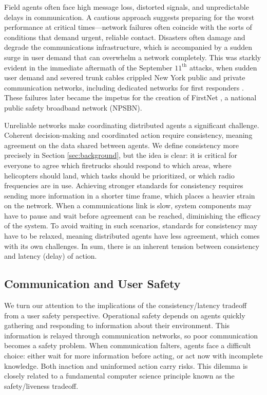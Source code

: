 \documentclass[]             %
{NASA}                       %
\theoremstyle{definition}
\begin{document}
Field agents often face high message loss, distorted signals, and
unpredictable delays in communication. A cautious approach suggests
preparing for the worst performance at critical times---network
failures often coincide with the sorts of conditions that demand
urgent, reliable contact. Disasters often damage and degrade the
communications infrastructure, which is accompanied by a sudden surge
in user demand that can overwhelm a network completely. This was
starkly evident in the immediate aftermath of the September
$11^\textrm{th}$ attacks, when sudden user demand and severed trunk
cables crippled New York public and private communication networks,
including dedicated networks for first responders
\cite{2011:Reardon}. These failures later became the impetus for the
creation of FirstNet \cite{2021:firstnet, 2021:firstnet2}, a national
public safety broadband network (NPSBN).

Unreliable networks make coordinating distributed agents a significant
challenge. Coherent decision-making and coordinated action require
consistency, meaning agreement on the data shared between agents. We
define consistency more precisely in Section \ref{sec:background}, but
the idea is clear: it is critical for everyone to agree which
firetrucks should respond to which areas, where helicopters should
land, which tasks should be prioritized, or which radio frequencies
are in use. Achieving stronger standards for consistency requires
sending more information in a shorter time frame, which places a
heavier strain on the network. When a communications link is slow,
system components may have to pause and wait before agreement can be
reached, diminishing the efficacy of the system. To avoid waiting in
such scenarios, standards for consistency may have to be relaxed,
meaning distributed agents have less agreement, which comes with its
own challenges. In sum, there is an inherent tension between
consistency and latency (delay) of action.

\subsection{Communication and User Safety}
\label{ssec:communication-and-safety}
We turn our attention to the implications of the consistency/latency
tradeoff from a user safety perspective. Operational safety depends on
agents quickly gathering and responding to information about their
environment. This information is relayed through communication
networks, so poor communication becomes a safety problem. When
communication falters, agents face a difficult choice: either wait for
more information before acting, or act now with incomplete
knowledge. Both inaction and uninformed action carry risks. This
dilemma is closely related to a fundamental computer science principle
known as the safety/liveness tradeoff.
\end{document}
